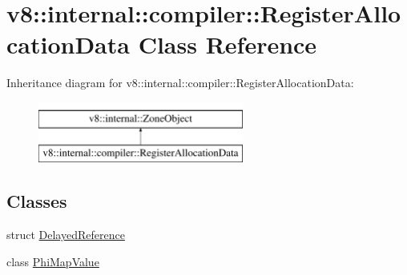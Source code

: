 \hypertarget{classv8_1_1internal_1_1compiler_1_1RegisterAllocationData}{}\section{v8\+:\+:internal\+:\+:compiler\+:\+:Register\+Allocation\+Data Class Reference}
\label{classv8_1_1internal_1_1compiler_1_1RegisterAllocationData}
Inheritance diagram for v8\+:\+:internal\+:\+:compiler\+:\+:Register\+Allocation\+Data\+:\begin{figure}[H]
\begin{center}
\leavevmode
\includegraphics[height=2.000000cm]{classv8_1_1internal_1_1compiler_1_1RegisterAllocationData}
\end{center}
\end{figure}
\subsection*{Classes}
\begin{DoxyCompactItemize}
\item 
struct \mbox{\hyperlink{structv8_1_1internal_1_1compiler_1_1RegisterAllocationData_1_1DelayedReference}{Delayed\+Reference}}
\item 
class \mbox{\hyperlink{classv8_1_1internal_1_1compiler_1_1RegisterAllocationData_1_1PhiMapValue}{Phi\+Map\+Value}}
\end{DoxyCompactItemize}
